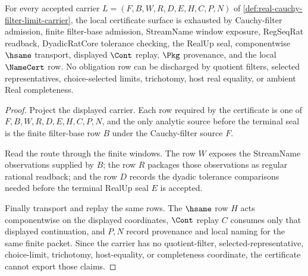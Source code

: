 \begin{theorem}
\label{thm:real-cauchy-filter-limit-namecert-obligations}
For every accepted carrier $L=(F,B,W,R,D,E,H,C,P,N)$ of \autoref{def:real-cauchy-filter-limit-carrier}, the local certificate surface is exhausted by Cauchy-filter admission, finite filter-base admission, StreamName window exposure, RegSeqRat readback, DyadicRatCore tolerance checking, the RealUp seal, componentwise $\hsame$ transport, displayed $\Cont$ replay, $\Pkg$ provenance, and the local $\NameCert$ row. No obligation row can be discharged by quotient filters, selected representatives, choice-selected limits, trichotomy, host real equality, or ambient Real completeness.
\end{theorem}
\begin{proof}
Project the displayed carrier. Each row required by the certificate is one of $F,B,W,R,D,E,H,C,P,N$, and the only analytic source before the terminal seal is the finite filter-base row $B$ under the Cauchy-filter source $F$.

Read the route through the finite windows. The row $W$ exposes the StreamName observations supplied by $B$; the row $R$ packages those observations as regular rational readback; and the row $D$ records the dyadic tolerance comparisons needed before the terminal RealUp seal $E$ is accepted.

Finally transport and replay the same rows. The $\hsame$ row $H$ acts componentwise on the displayed coordinates, $\Cont$ replay $C$ consumes only that displayed continuation, and $P,N$ record provenance and local naming for the same finite packet. Since the carrier has no quotient-filter, selected-representative, choice-limit, trichotomy, host-equality, or completeness coordinate, the certificate cannot export those claims.
\end{proof}

